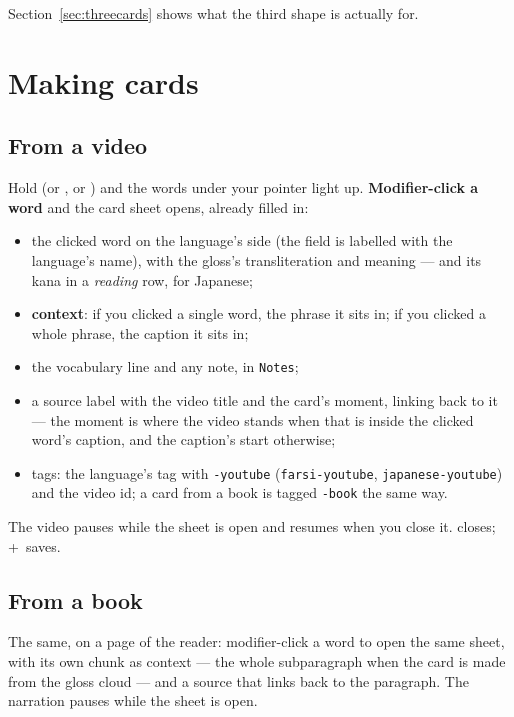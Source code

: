 \documentclass[11pt,oneside]{report}
\newcommand{\key}[1]{\textsf{\small\fbox{#1}}}
\begin{document}
Section~\ref{sec:threecards} shows what the third shape is actually for.

\chapter{Making cards}
\label{ch:cards}

\section{From a video}

Hold \key{Alt} (or \key{Ctrl}, or \key{Cmd}) and the words under your
pointer light up. \textbf{Modifier-click a word} and the card sheet
opens, already filled in:

\begin{itemize}
\item the clicked word on the language's side (the field is labelled with
  the language's name), with the gloss's transliteration and meaning --- and
  its kana in a \emph{reading} row, for Japanese;
\item \textbf{context}: if you clicked a single word, the phrase it sits in;
  if you clicked a whole phrase, the caption it sits in;
\item the vocabulary line and any note, in \texttt{Notes};
\item a source label with the video title and the card's moment, linking
  back to it --- the moment is where the video stands when that is inside
  the clicked word's caption, and the caption's start otherwise;
\item tags: the language's tag with \texttt{-youtube} (\texttt{farsi-youtube},
  \texttt{japanese-youtube}) and the video id; a card from a book is tagged
  \texttt{-book} the same way.
\end{itemize}

The video pauses while the sheet is open and resumes when you close it.
\key{Esc} closes; \key{Ctrl}\,+\,\key{Enter} saves.

\section{From a book}

The same, on a page of the reader: modifier-click a word to open the same
sheet, with its own chunk as context --- the whole subparagraph when the
card is made from the gloss cloud --- and a source that links back to the
paragraph. The narration pauses while the sheet is open.
\end{document}
